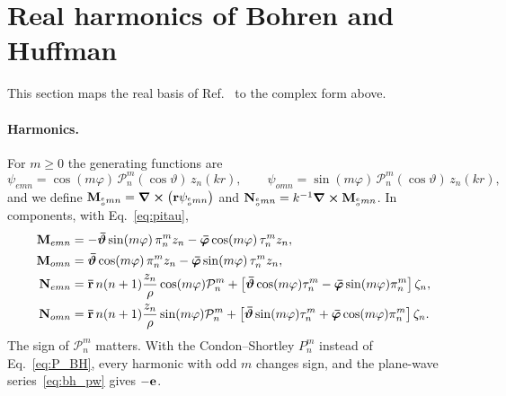 \documentclass[
    pra,
    aps,
    reprint,
    onecolumn,
    amsmath,amssymb,
    a4paper,
    superscriptaddress,
    10pt,
    nofootinbib
]{revtex4-2}
\newcommand{\ort}[1]{\boldsymbol{\mathbf{\bar{#1}}}}  %
\begin{document}
\section{Real harmonics of Bohren and Huffman}
\label{sec:bh}

This section maps the real basis of Ref.~\cite{Bohren1984} to the complex form above.

\paragraph{Harmonics.}
For $m \geq 0$ the generating functions are
\begin{equation}
    \psi_{emn} = \cos(m\varphi)\,\mathcal{P}_n^m(\cos\vartheta)\,z_n(kr), \qquad
    \psi_{omn} = \sin(m\varphi)\,\mathcal{P}_n^m(\cos\vartheta)\,z_n(kr),
    \label{eq:bh_psi}
\end{equation}
and we define $\vb{M}_{^e_o mn} = \curl(\vb{r}\psi_{^e_o mn})$ and $\vb{N}_{^e_o mn} = k^{-1}\curl\vb{M}_{^e_o mn}$.
In components, with Eq.~\eqref{eq:pitau},
\begin{align}
    \vb{M}_{emn} &= -\ort{\vartheta}\sin(m\varphi)\,\pi^m_n z_n - \ort{\varphi}\cos(m\varphi)\,\tau^m_n z_n, \nonumber \\
    \vb{M}_{omn} &= \ort{\vartheta}\cos(m\varphi)\,\pi^m_n z_n - \ort{\varphi}\sin(m\varphi)\,\tau^m_n z_n, \nonumber \\
    \vb{N}_{emn} &= \ort{r}\, n(n+1)\frac{z_n}{\rho}\cos(m\varphi)\mathcal{P}^m_n + \left[\ort{\vartheta}\cos(m\varphi)\tau^m_n - \ort{\varphi}\sin(m\varphi)\pi^m_n\right]\zeta_n, \label{eq:bh_vsh} \\
    \vb{N}_{omn} &= \ort{r}\, n(n+1)\frac{z_n}{\rho}\sin(m\varphi)\mathcal{P}^m_n + \left[\ort{\vartheta}\sin(m\varphi)\tau^m_n + \ort{\varphi}\cos(m\varphi)\pi^m_n\right]\zeta_n . \nonumber
\end{align}
The sign of $\mathcal{P}_n^m$ matters.
With the Condon--Shortley $P_n^m$ instead of Eq.~\eqref{eq:P_BH}, every harmonic with odd $m$ changes sign, and the plane-wave series~\eqref{eq:bh_pw} gives $-\vb{e}$.
\end{document}
